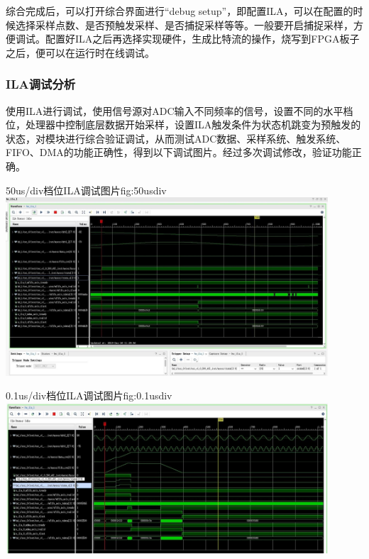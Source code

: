 \documentclass[supercite]{HustGraduPaper}
\begin{document}

综合完成后，可以打开综合界面进行“debug setup”，即配置ILA，可以在配置的时候选择采样点数、是否预触发采样、是否捕捉采样等等。一般要开启捕捉采样，方便调试。配置好ILA之后再选择实现硬件，生成比特流的操作，烧写到FPGA板子之后，便可以在运行时在线调试。


\subsubsection{ILA调试分析}

使用ILA进行调试，使用信号源对ADC输入不同频率的信号，设置不同的水平档位，处理器中控制底层数据开始采样，设置ILA触发条件为状态机跳变为预触发的状态，对模块进行综合验证调试，从而测试ADC数据、采样系统、触发系统、FIFO、DMA的功能正确性，得到以下调试图片。经过多次调试修改，验证功能正确。

\begin{generalfig}[htb]{50us/div档位ILA调试图片}{fig:50usdiv}
	\includegraphics[width=12cm]{Figures/50usdiv.jpg}
\end{generalfig}

\begin{generalfig}[htb]{0.1us/div档位ILA调试图片}{fig:0.1usdiv}
	\includegraphics[width=12cm]{Figures/0.1usdiv.jpg}
\end{generalfig}
\end{document}
